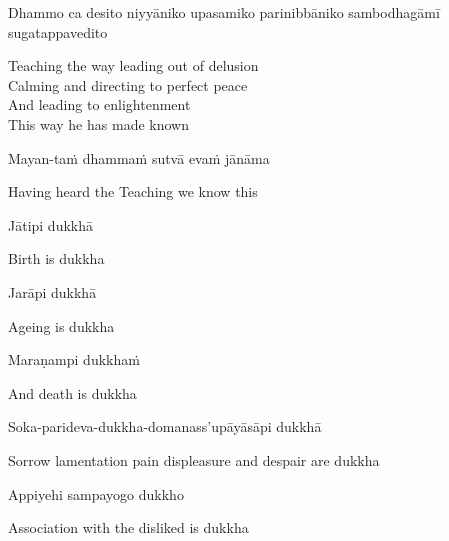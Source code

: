 \begin{pali-hang}
  Dhammo ca desito niyyāniko upasamiko parinibbāniko sambodhagāmī sugatappavedito
\end{pali-hang}

\begin{english-verses}
  Teaching the way leading out of delusion\hyperlink{endnote13-appendix}{\hypertarget{endnote13-body}{}}\\
  Calming and directing to perfect peace\\
  And leading to enlightenment\\
  This way he has made known\\
\end{english-verses}

Mayan-taṁ dhammaṁ sutvā evaṁ jānāma

\begin{english}
  Having heard the Teaching we know this
\end{english}

Jātipi dukkhā

\begin{english}
  Birth is dukkha
\end{english}

Jarāpi dukkhā

\begin{english}
  Ageing is dukkha
\end{english}

Maraṇampi dukkhaṁ

\begin{english}
  And death is dukkha
\end{english}

Soka-parideva-dukkha-domanass'upāyāsāpi dukkhā

\begin{english}
  Sorrow lamentation pain displeasure\hyperlink{endnote14-appendix}{\hypertarget{endnote14-body}{}}
  and despair are dukkha
\end{english}

Appiyehi sampayogo dukkho

\begin{english}
  Association with the disliked is dukkha
\end{english}

